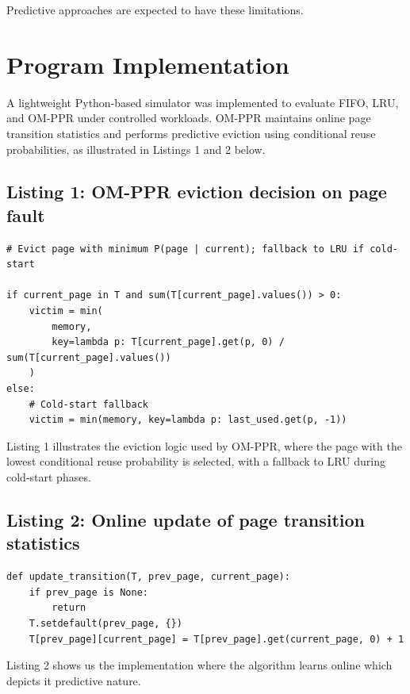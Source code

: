 \documentclass[conference]{IEEEtran}
\begin{document}
Predictive approaches are expected to have these limitations.
\vspace{0.7\baselineskip}


\section{Program Implementation}

A lightweight Python-based simulator was implemented to evaluate FIFO, LRU, and OM-PPR under controlled workloads. OM-PPR maintains online page transition statistics and performs predictive eviction using conditional reuse probabilities, as illustrated in Listings 1 and 2 below.
\vspace{0.7\baselineskip}


\subsection*{Listing 1: OM-PPR eviction decision on page fault}

\begin{lstlisting}
# Evict page with minimum P(page | current); fallback to LRU if cold-start

if current_page in T and sum(T[current_page].values()) > 0:
    victim = min(
        memory,
        key=lambda p: T[current_page].get(p, 0) / sum(T[current_page].values())
    )
else:
    # Cold-start fallback
    victim = min(memory, key=lambda p: last_used.get(p, -1))
\end{lstlisting}
\vspace{0.7\baselineskip}

Listing 1 illustrates the eviction logic used by OM-PPR, where the page with the lowest conditional reuse probability is selected, with a fallback to LRU during cold-start phases.

\subsection*{Listing 2: Online update of page transition statistics}

\begin{lstlisting}
def update_transition(T, prev_page, current_page):
    if prev_page is None:
        return
    T.setdefault(prev_page, {})
    T[prev_page][current_page] = T[prev_page].get(current_page, 0) + 1
\end{lstlisting}
\vspace{0.7\baselineskip}


Listing 2 shows us the implementation where the algorithm learns online which depicts it predictive nature.
\end{document}
